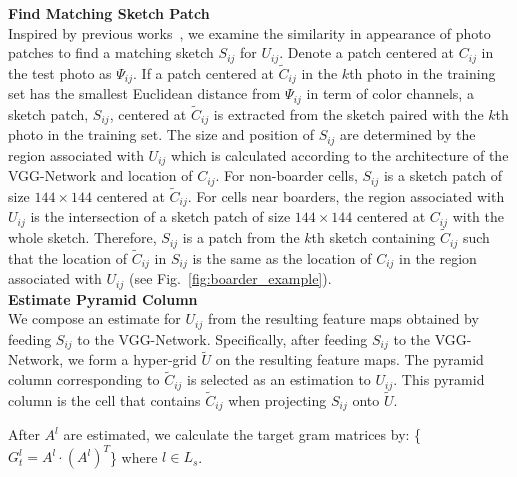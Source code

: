 \documentclass[10pt,twocolumn,letterpaper]{article}
\begin{document}
{\noindent \bf Find Matching Sketch Patch}\\
Inspired by previous works~\cite{wang2009face,zhou2012markov}, we examine the similarity in appearance of photo patches to find a matching sketch $S_{ij}$ for $U_{ij}$. Denote a patch centered at $C_{ij}$ in the test photo as $\Psi_{ij}$. If a patch centered at $\tilde{C}_{ij}$ in the $k$th photo in the training set has the smallest Euclidean distance from $\Psi_{ij}$ in term of color channels, a sketch patch, $S_{ij}$, centered at $\tilde{C}_{ij}$ is extracted from the sketch paired with the $k$th photo in the training set. The size and position of $S_{ij}$ are determined by the region associated with $U_{ij}$ which is calculated according to the architecture of the VGG-Network and location of $C_{ij}$. For non-boarder cells, $S_{ij}$ is a sketch patch of size $144\times144$ centered at $\tilde{C}_{ij}$. For cells near boarders, the region associated with $U_{ij}$ is the intersection of a sketch patch of size $144\times144$ centered at $C_{ij}$ with the whole sketch. Therefore, $S_{ij}$ is a patch from the $k$th sketch containing $\tilde{C}_{ij}$ such that the location of $\tilde{C}_{ij}$ in $S_{ij}$ is the same as the location of $C_{ij}$ in the region associated with $U_{ij}$ (see Fig.~\ref{fig:boarder_example}).\\
{\bf Estimate Pyramid Column}\\
We compose an estimate for $U_{ij}$ from the resulting feature maps obtained by feeding $S_{ij}$ to the VGG-Network. Specifically, after feeding $S_{ij}$ to the VGG-Network, we form a hyper-grid $\tilde{U}$ on the resulting feature maps. The pyramid column corresponding to $\tilde{C}_{ij}$ is selected as an estimation to $U_{ij}$. This pyramid column is the cell that contains $\tilde{C}_{ij}$ when projecting $S_{ij}$ onto $\tilde{U}$.\par
After $A^{l}$ are estimated, we calculate the target gram matrices by: \{$G_{t}^l =A^{l} \cdot {\left( {{A^{l}}} \right)^T}$\} where $l\in L_s$.
\end{document}

